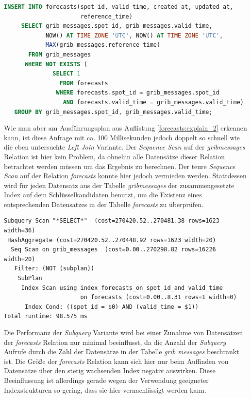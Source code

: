 \begin{lstlisting}[captionpos=b, caption=Hinzufügen von Datensätzen mittels Subquery, label=forecasts:insert_2, language=SQL]
INSERT INTO forecasts(spot_id, valid_time, created_at, updated_at, 
                      reference_time)
     SELECT grib_messages.spot_id, grib_messages.valid_time, 
            NOW() AT TIME ZONE 'UTC', NOW() AT TIME ZONE 'UTC', 
            MAX(grib_messages.reference_time)
       FROM grib_messages
      WHERE NOT EXISTS (
              SELECT 1 
                FROM forecasts 
               WHERE forecasts.spot_id = grib_messages.spot_id
                 AND forecasts.valid_time = grib_messages.valid_time)
   GROUP BY grib_messages.spot_id, grib_messages.valid_time;
\end{lstlisting}

Wie man aber am Ausführungsplan aus Auflistung
\ref{forecasts:explain_2} erkennen kann, ist diese Anfrage mit ca. 100
Millisekunden jedoch doppelt so schnell wie die eben untersuchte
\textit{Left Join} Variante. Der \textit{Sequence Scan} auf der
\textit{grib\textunderscore messages} Relation ist hier kein Problem,
da ohnehin alle Datensätze dieser Relation betrachtet werden müssen um
das Ergebnis zu berechnen. Der teure \textit{Sequence Scan} auf der
Relation \textit{forecasts} konnte hier jedoch vermieden
werden. Stattdessen wird für jeden Datensatz aus der Tabelle
\textit{grib\textunderscore messages} der zusammengesetzte Index auf
dem Schlüsselkandidaten benutzt, um die Existenz eines entsprechenden
Datensatzes in der Tabelle \textit{forecasts} zu überprüfen.

\begin{lstlisting}[captionpos=b, caption=Ausführungsplan der Subquery, label=forecasts:explain_2]
Subquery Scan "*SELECT*"  (cost=270420.52..270481.38 rows=1623 width=36)
 HashAggregate (cost=270420.52..270448.92 rows=1623 width=20)
  Seq Scan on grib_messages  (cost=0.00..270298.82 rows=16226 width=20)
   Filter: (NOT (subplan))
    SubPlan
     Index Scan using index_forecasts_on_spot_id_and_valid_time 
                      on forecasts (cost=0.00..8.31 rows=1 width=0)
      Index Cond: ((spot_id = $0) AND (valid_time = $1))
Total runtime: 98.575 ms
\end{lstlisting}

Die Performanz der \textit{Subquery} Variante wird bei einer Zunahme
von Datensätzen der \textit{forecasts} Relation nur minimal
beeinflusst, da die Anzahl der \textit{Subquery} Aufrufe durch die
Zahl der Datensätze in der Tabelle \textit{grib\textunderscore
  messages} beschränkt ist. Die Größe der \textit{forecasts} Relation
kann sich hier nur beim Auffinden von Datensätze über den stetig
wachsenden Index negativ auswirken. Diese Beeinflussung ist allerdings
gerade wegen der Verwendung geeigneter Indexstrukturen so gering, dass
sie hier vernachlässigt werden kann.

